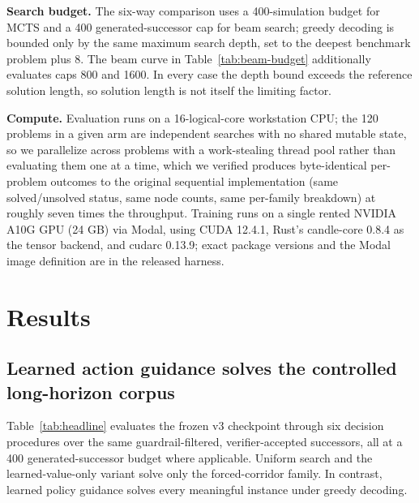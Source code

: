\documentclass[11pt]{article}
\numberwithin{equation}{section}
\begin{document}
\textbf{Search budget.} The six-way comparison uses a 400-simulation budget for MCTS and a 400 generated-successor cap for beam search; greedy decoding is bounded only by the same maximum search depth, set to the deepest benchmark problem plus 8. The beam curve in Table~\ref{tab:beam-budget} additionally evaluates caps 800 and 1600. In every case the depth bound exceeds the reference solution length, so solution length is not itself the limiting factor.

\textbf{Compute.} Evaluation runs on a 16-logical-core workstation CPU; the 120 problems in a given arm are independent searches with no shared mutable state, so we parallelize across problems with a work-stealing thread pool rather than evaluating them one at a time, which we verified produces byte-identical per-problem outcomes to the original sequential implementation (same solved/unsolved status, same node counts, same per-family breakdown) at roughly seven times the throughput. Training runs on a single rented NVIDIA A10G GPU (24 GB) via Modal, using CUDA 12.4.1, Rust's candle-core 0.8.4 as the tensor backend, and cudarc 0.13.9; exact package versions and the Modal image definition are in the released harness.

\section{Results}
\label{sec:results}

\subsection{Learned action guidance solves the controlled long-horizon corpus}
\label{sec:headline}

Table~\ref{tab:headline} evaluates the frozen v3 checkpoint through six decision procedures over the same guardrail-filtered, verifier-accepted successors, all at a 400 generated-successor budget where applicable. Uniform search and the learned-value-only variant solve only the forced-corridor family. In contrast, learned policy guidance solves every meaningful instance under greedy decoding.
\end{document}
